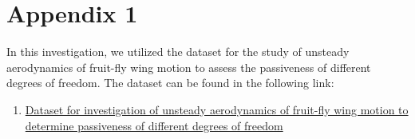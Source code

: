 \chapter{Appendix 1}


In this investigation, we utilized the dataset for the study of unsteady aerodynamics of fruit-fly wing motion to assess the passiveness of different degrees of freedom. The dataset can be found in the following link:
\\

\begin{enumerate}
  \item \href{https://drive.google.com/drive/folders/15E-ALyWlnrwKhmBRBAaDh-KMUiXRS_ga?usp=sharing}{Dataset for investigation of unsteady aerodynamics of fruit-fly wing motion to determine passiveness of different degrees of freedom}
\end{enumerate}